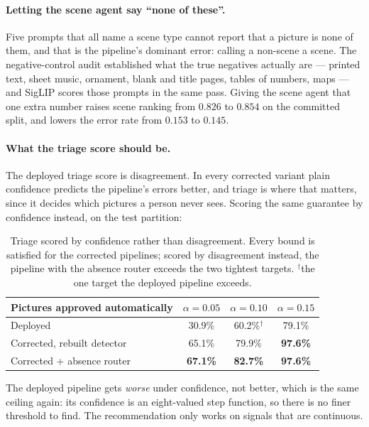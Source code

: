 \documentclass[11pt,a4paper]{article}
\begin{document}
\paragraph{Letting the scene agent say ``none of these''.} Five prompts that all name a scene type
cannot report that a picture is none of them, and that is the pipeline's dominant error: calling a
non-scene a scene. The negative-control audit established what the true negatives actually are ---
printed text, sheet music, ornament, blank and title pages, tables of numbers, maps --- and SigLIP
scores those prompts in the same pass. Giving the scene agent that one extra number raises scene
ranking from $0.826$ to $0.854$ on the committed split, and lowers the error rate from $0.153$ to $0.145$.

\paragraph{What the triage score should be.} The deployed triage score is disagreement. In every
corrected variant plain confidence predicts the pipeline's errors better, and triage is where that
matters, since it decides which pictures a person never sees. Scoring the same guarantee by
confidence instead, on the test partition:

\begin{table}[h]
\centering
\small
\begin{tabular}{lccc}
\toprule
Pictures approved automatically & $\alpha=0.05$ & $\alpha=0.10$ & $\alpha=0.15$ \\
\midrule
Deployed & 30.9\% & 60.2\%$^\dagger$ & 79.1\% \\
Corrected, rebuilt detector & 65.1\% & 79.9\% & \textbf{97.6\%} \\
Corrected + absence router & \textbf{67.1\%} & \textbf{82.7\%} & \textbf{97.6\%} \\
\bottomrule
\end{tabular}
\caption{Triage scored by confidence rather than disagreement. Every bound is satisfied for the
corrected pipelines; scored by disagreement instead, the pipeline with the absence router exceeds the
two tightest targets.
$^\dagger$the one target the deployed pipeline exceeds.}
\end{table}

The deployed pipeline gets \emph{worse} under confidence, not better, which is the same ceiling
again: its confidence is an eight-valued step function, so there is no finer threshold to find. The
recommendation only works on signals that are continuous.
\end{document}
